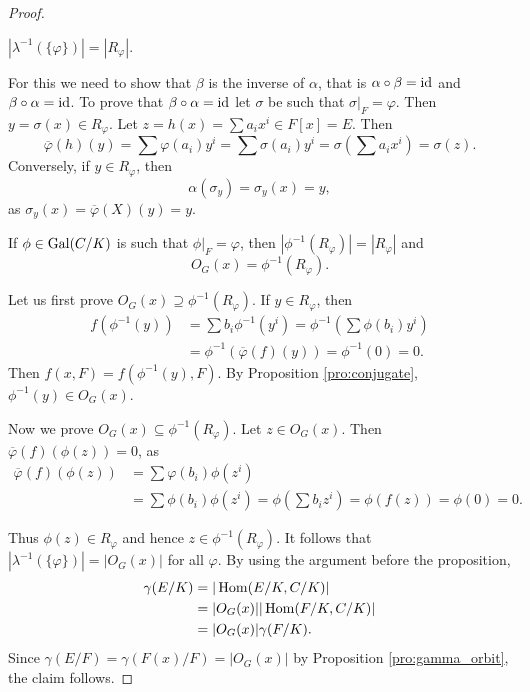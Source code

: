 \begin{proof}
    \begin{claim}
        $|\lambda^{-1}(\{\varphi\})|=|R_\varphi|$. 
    \end{claim}
    
    For this we need to show that $\beta$ is
    the inverse of $\alpha$, that is 
    $\alpha\circ\beta=\operatorname{id}$ and $\beta\circ\alpha=\operatorname{id}$. 
    To prove that $\beta\circ\alpha=\operatorname{id}$ 
    let $\sigma$ be such that $\sigma|_F=\varphi$. 
    Then $y=\sigma(x)\in R_\varphi$. Let
    $z=h(x)=\sum a_ix^i\in F[x]=E$. Then  
    \[
    \overline{\varphi}(h)(y)=\sum\varphi(a_i)y^i=\sum\sigma(a_i)y^i
    =\sigma\left(\sum a_ix^i\right)=\sigma(z).
    \]
    Conversely, if $y\in R_\varphi$, then
    \[
    \alpha(\sigma_y)=\sigma_y(x)=y,
    \]
    as $\sigma_y(x)=\overline{\varphi}(X)(y)=y$.
    
    \begin{claim}
        If $\phi\in\operatorname{Gal}(C/K)$ is such that $\phi|_F=\varphi$, then 
        $|\phi^{-1}(R_\varphi)|=|R_{\varphi}|$ and 
        \[
        O_{G}(x)=\phi^{-1}(R_\varphi).
        \]
    \end{claim}

    Let us first prove $O_{G}(x)\supseteq \phi^{-1}(R_\varphi)$.
    If $y\in R_{\varphi}$, 
    then 
    \begin{align*}
    f(\phi^{-1}(y))&=\sum b_i\phi^{-1}(y^i)=\phi^{-1}\left(\sum\phi(b_i)y^i\right)\\
&=\phi^{-1}(\overline{\varphi}(f)(y))=\phi^{-1}(0)=0.
    \end{align*}
    Then $f(x,F)=f(\phi^{-1}(y),F)$. By Proposition \ref{pro:conjugate}, $\phi^{-1}(y)\in O_G(x)$. 
    
    Now we prove $O_{G}(x)\subseteq\phi^{-1}(R_\varphi)$.
    Let $z\in O_{G}(x)$. Then $\overline{\varphi}(f)(\phi(z))=0$, as
    \begin{align*}
    \overline{\varphi}(f)(\phi(z))&=\sum\varphi(b_i)\phi(z^i)\\
    &=\sum\phi(b_i)\phi(z^i)
    =\phi\left(\sum b_iz^i\right)
    =\phi(f(z))=\phi(0)=0.
    \end{align*}
    
    \medskip
    Thus $\phi(z)\in R_{\varphi}$ and hence $z\in\phi^{-1}(R_{\varphi})$. 
    It follows that $|\lambda^{-1}(\{\varphi\})|=|O_{G}(x)|$ for
    all $\varphi$. By using the argument
    before the proposition, 
    \begin{align*}
    \gamma(E/K)&=|\operatorname{Hom}(E/K,C/K)|\\
        &=|O_{G}(x)||\operatorname{Hom}(F/K,C/K)|\\
        &=|O_{G}(x)|\gamma(F/K).
    \end{align*}
    Since $\gamma(E/F)=\gamma(F(x)/F)=|O_{G}(x)|$ by Proposition \ref{pro:gamma_orbit}, the claim follows. 
    

\end{proof}
